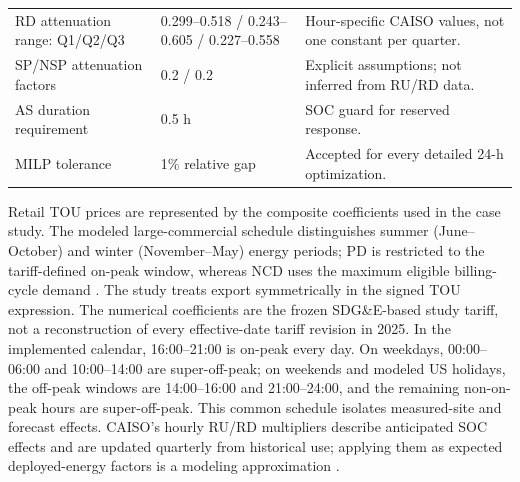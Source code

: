 \documentclass[final,5p,times]{elsarticle}
\begin{document}
\begin{table}[!t]
\begin{tabularx}{\textwidth}{@{}p{}p{}X@{}}
RD attenuation range: Q1/Q2/Q3 & 0.299--0.518 / 0.243--0.605 / 0.227--0.558 & Hour-specific CAISO values, not one constant per quarter. \\
SP/NSP attenuation factors & 0.2 / 0.2 & Explicit assumptions; not inferred from RU/RD data. \\
AS duration requirement & 0.5 h & SOC guard for reserved response. \\
MILP tolerance & 1\% relative gap & Accepted for every detailed 24-h optimization. \\
\bottomrule
\end{tabularx}
\end{table}

Retail TOU prices are represented by the composite coefficients used in the
case study. The modeled large-commercial schedule distinguishes summer
(June--October) and winter (November--May) energy periods; PD is restricted to
the tariff-defined on-peak window, whereas NCD uses the maximum eligible
billing-cycle demand \cite{sdgeLargeCommercial2025} \cite{sdgeDemandGuide2026}. The
study treats export symmetrically in the signed TOU expression. The numerical
coefficients are the frozen SDG\&E-based study tariff, not a reconstruction of
every effective-date tariff revision in 2025. In the implemented calendar,
16:00--21:00 is on-peak every day. On weekdays, 00:00--06:00 and 10:00--14:00
are super-off-peak; on weekends and modeled US holidays, the off-peak windows
are 14:00--16:00 and 21:00--24:00, and the remaining non-on-peak hours are
super-off-peak. This common schedule isolates measured-site and forecast effects.
CAISO's hourly RU/RD multipliers describe anticipated SOC effects and are
updated quarterly from historical use; applying them as expected deployed-energy
factors is a modeling approximation \cite{caisoAttenuation2025}. 
\end{document}
